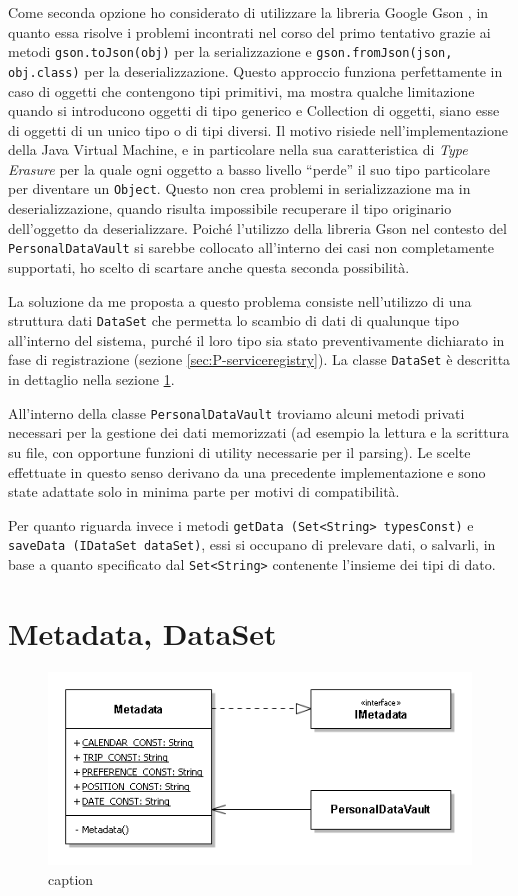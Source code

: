 Come seconda opzione ho considerato di utilizzare la libreria Google Gson \cite{googlegson}, in quanto essa risolve i problemi incontrati nel corso del primo tentativo grazie ai metodi \texttt{gson.toJson(obj)} per la serializzazione e \texttt{gson.fromJson(json, obj.class)} per la deserializzazione. Questo approccio funziona perfettamente in caso di oggetti che contengono tipi primitivi, ma mostra qualche limitazione quando si introducono oggetti di tipo generico e Collection di oggetti, siano esse di oggetti di un unico tipo o di tipi diversi. Il motivo risiede nell’implementazione della Java Virtual Machine, e in particolare nella sua caratteristica di \textit{Type Erasure} per la quale ogni oggetto a basso livello “perde” il suo tipo particolare per diventare un \texttt{Object}. Questo non crea problemi in serializzazione ma in deserializzazione, quando risulta impossibile recuperare il tipo originario dell’oggetto da deserializzare. Poich\'e l’utilizzo della libreria Gson nel contesto del \texttt{PersonalDataVault} si sarebbe collocato all’interno dei casi non completamente supportati, ho scelto di scartare anche questa seconda possibilit\`a.

La soluzione da me proposta a questo problema consiste nell’utilizzo di una struttura dati \texttt{DataSet} che permetta lo scambio di dati di qualunque tipo all’interno del sistema, purch\'e il loro tipo sia stato preventivamente dichiarato in fase di registrazione (sezione \ref{sec:P-serviceregistry}). La classe \texttt{DataSet} \`e descritta in dettaglio nella sezione \ref{sec:P-metadataDataset}.

All’interno della classe \texttt{PersonalDataVault} troviamo alcuni metodi privati necessari per la gestione dei dati memorizzati (ad esempio la lettura e la scrittura su file, con opportune funzioni di utility necessarie per il parsing). Le scelte effettuate in questo senso derivano da una precedente implementazione e sono state adattate solo in minima parte per motivi di compatibilit\`a.

Per quanto riguarda invece i metodi \texttt{getData (Set<String> typesConst)} e \texttt{saveData (IDataSet dataSet)}, essi si occupano di prelevare dati, o salvarli, in base a quanto specificato dal \texttt{Set<String>} contenente l’insieme dei tipi di dato.


\section{Metadata, DataSet}
\label{sec:P-metadataDataset}
\begin{figure} [h]
	\centering
	\includegraphics[width=0.7\linewidth]{pictures/Metadata.png}
	\caption{caption}
	\label{fig:Metadata}
\end{figure}

